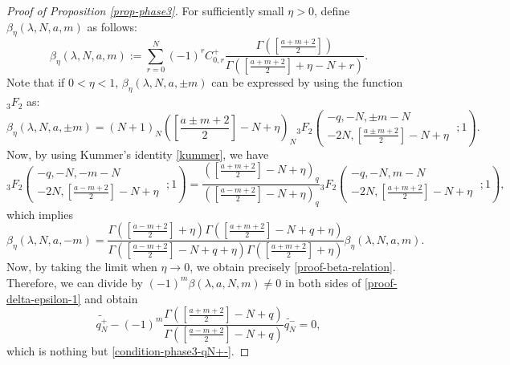 \documentclass[12pt, pdflatex, a4paper]{article}
\theoremstyle{plain}
\theoremstyle{definition}
\begin{document}
\begin{proof}[Proof of Proposition \ref{prop-phase3}]
For sufficiently small $\eta > 0$, define $\beta_\eta(\lambda, N, a, m)$ as follows:
\begin{equation*}
\beta_\eta(\lambda, N, a, m) := \sum_{r = 0}^{N}(-1)^r C_{0,r}^+\frac{\Gamma\left(\left[\frac{a+m+2}{2}\right]\right)}{\Gamma\left(\left[\frac{a+m+2}{2}\right]+\eta-N+r\right)}.
\end{equation*}
Note that if $0<\eta<1$, $\beta_\eta(\lambda, N, a, \pm m)$ can be expressed by using the function ${}_3F_2$ as:
\begin{equation*}
\beta_\eta(\lambda, N, a, \pm m) = (N+1)_N\left(\left[\frac{a\pm m+2}{2}\right] -N + \eta \right)_N  {}_3F_2\left(\begin{matrix}
-q, -N, \pm m -N\\
-2N, \left[\frac{a\pm m+2}{2}\right]-N +\eta
\end{matrix}\; ; 1\right).
\end{equation*}
Now, by using Kummer's identity \eqref{kummer}, we have
\begin{equation*}
_3F_2\left(\begin{matrix}
-q, -N, -m -N\\
-2N, \left[\frac{a-m+2}{2}\right]-N + \eta
\end{matrix}\; ; 1\right) = \frac{\left(\left[\frac{a+ m+2}{2}\right]-N +\eta\right)_q}{\left(\left[\frac{a- m+2}{2}\right]-N +\eta\right)_q}{}_3F_2\left(\begin{matrix}
-q, -N, m -N\\
-2N, \left[\frac{a+ m+2}{2}\right]-N+\eta
\end{matrix}\; ; 1\right),
\end{equation*}
which implies
\begin{equation*}
\beta_\eta(\lambda, N, a, -m) = \frac{\Gamma\left(\left[\frac{a-m+2}{2}\right] + \eta\right)\Gamma\left(\left[\frac{a+m+2}{2}\right] -N+q + \eta\right)}{\Gamma\left(\left[\frac{a-m+2}{2}\right] -N+q + \eta\right)\Gamma\left(\left[\frac{a+m+2}{2}\right] +\eta\right)}\beta_\eta(\lambda, N, a, m).
\end{equation*}
Now, by taking the limit when $\eta \rightarrow 0$, we obtain precisely \eqref{proof-beta-relation}. Therefore, we can divide by $(-1)^m\beta(\lambda, a, N, m) \neq 0$ in both sides of \eqref{proof-delta-epsilon-1} and obtain
\begin{equation*}
\widetilde{q_N^+} - (-1)^m \frac{\Gamma(\left[\frac{a+m+2}{2}\right]-N+q)}{\Gamma(\left[\frac{a-m+2}{2}\right] -N+q)} \widetilde{q_N^-} = 0,
\end{equation*}
which is nothing but \eqref{condition-phase3-qN+-}.


\end{proof}
\end{document}
